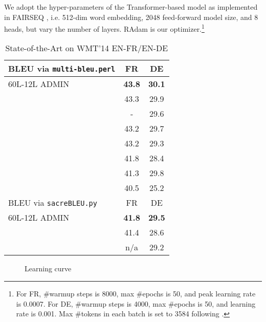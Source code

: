 \documentclass[11pt,a4paper]{article}
\begin{document}
We adopt the hyper-parameters of the Transformer-based model \cite{vaswani2017attention} as implemented in FAIRSEQ \cite{ott2019fairseq}, i.e. 512-dim word embedding, 2048 feed-forward model size, and 8 heads, but vary the number of layers. RAdam \cite{liu2019radam} is our optimizer.\footnote{For FR, \#warmup steps is 8000,  max \#epochs is 50, and peak learning rate is 0.0007. For DE, \#warmup steps is 4000,  max \#epochs is 50, and learning rate is 0.001. Max \#tokens in each batch is set to 3584 following \cite{ott2019fairseq}.} 

\begin{table}[ht]
    \centering
    \begin{tabular}{|l|c|c|}
    \hline
BLEU via \texttt{multi-bleu.perl} & FR & DE \\\hline
        60L-12L ADMIN & {\bf 43.8}  & {\bf 30.1}\\
        \cite{wu2019depth}  & 43.3 & 29.9 \\
        \cite{wang2019preln} & - & 29.6\\
        \cite{wu19dycnn}  & 43.2 & 29.7 \\
        \cite{ott-etal-2018-scaling} & 43.2 & 29.3 \\
        \cite{vaswani2017attention} & 41.8 & 28.4 \\
        \cite{so19evolved}   & 41.3 & 29.8 \\    
        \cite{gehring2017}  & 40.5 & 25.2\\
        \hline\hline
BLEU via \texttt{sacreBLEU.py} & FR & DE \\\hline
        60L-12L ADMIN & {\bf 41.8}  & {\bf 29.5} \\        
\cite{ott-etal-2018-scaling} & 41.4 & 28.6 \\
        \cite{so19evolved}   & n/a & 29.2 \\    
        \hline
    \end{tabular}
    \caption{State-of-the-Art on WMT'14 EN-FR/EN-DE}
    \label{tab:sota}
\vspace{-4mm}    
\end{table}






\begin{figure}[th]
\centering  
{}
\caption{Learning curve}
	\label{fig:learning}	
\end{figure}
\end{document}

